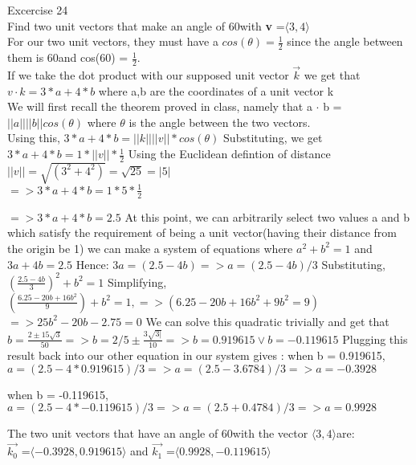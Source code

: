 \documentclass[12pt]{article}
\newenvironment{statement}[2][Section]{\begin{trivlist}
\item[\hskip \labelsep {\bfseries #1}\hskip \labelsep {\bfseries #2.}]}{\end{trivlist}}
\begin{document}
\thispagestyle{secondpage} %
\begin{statement}{10.3}
	Excercise 24\\
	Find two unit vectors that make an angle of 60\textdegree with \textbf{v} =$ \langle3,4\rangle$\\
	For our two unit vectors, they must have a $cos(\theta) = \frac{1}{2}$ since the angle between them is 60\textdegree and cos(60) = $\frac{1}{2}$. \\
	
	If we take the dot product with our supposed unit vector \textbf{$\vec{k}$} we get that $v \cdot k = 3*a + 4*b$ where a,b are the coordinates of a unit vector k
	\\
	We will first recall the theorem proved in class, namely that
	a $\cdot$ b = $||a|| ||b|| cos(\theta)$ where $\theta$ is the angle between the two vectors.
	\\
	Using this, $ 3*a + 4*b = ||k|| ||v|| * cos(\theta)$ Substituting, we get 
	$ 3*a + 4*b = 1 * ||v|| * \frac{1}{2}$ 
	Using the Euclidean defintion of distance $||v|| = \sqrt{(3^2 + 4^2)} = \sqrt{25} = |5|$
	\\
	$=>  3*a + 4*b = 1 * 5 * \frac{1}{2}$ 
	
	$=>  3*a + 4*b = 2.5$
	At this point, we can arbitrarily select two values a and b which satisfy the requirement of being a unit vector(having their distance from the origin be 1)
	we can make a system of equations where $a^2 + b^2 = 1$ and $ 3a +4b = 2.5$
	Hence: $3a = (2.5-4b) => a = (2.5-4b)/3$ Substituting, $(\frac{2.5-4b}{3})^2 + b^2 = 1$
	Simplifying, $(\frac{6.25-20b + 16b^2}{9}) +b^2 = 1 , => (6.25 -20b +16b^2 +9b^2 = 9)$
	$=> 25b^2 - 20b -2.75 = 0$ We can solve this quadratic trivially and get that $b = \frac{2\pm 15\sqrt{3}}{50} => b = 2/5 \pm \frac{3\sqrt{3|}}{10} => b=0.919615 \lor b = -0.119615$
	Plugging this result back into our other equation in our system gives : when b = 0.919615, $ a = (2.5 -4*0.919615) / 3 => a = (2.5 - 3.6784) / 3 => a = -0.3928$
	
	when b = -0.119615, $ a = (2.5 -4*-0.119615) / 3 => a = (2.5 + 0.4784) / 3 => a = 0.9928$
	
	The two unit vectors that have an angle of 60\textdegree with the vector $\langle3,4\rangle $are:\\
	
	$\vec{k_0}$ =$ \langle-0.3928,0.919615\rangle$ and  $ \vec{k_1}$ =$ \langle0.9928, -0.119615\rangle$
	
\end{statement}





 
\end{document}
